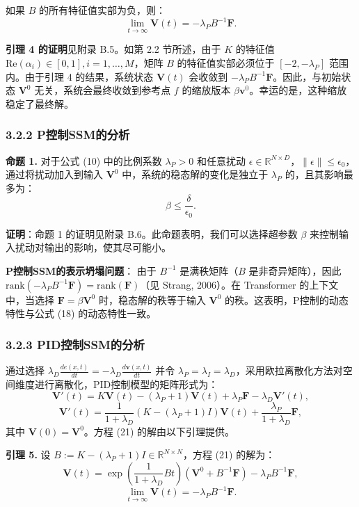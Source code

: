 \documentclass[lang=cn,a4paper,newtx]{elegantpaper}
\begin{document}
如果 $B$ 的所有特征值实部为负，则：
\[
\lim_{t \to \infty} \mathbf{V}(t) = -\lambda_P B^{-1}\mathbf{F}.
\]

\textbf{引理 4 的证明}见附录 B.5。如第 2.2 节所述，由于 $K$ 的特征值 $\text{Re}(\alpha_i) \in [0, 1], i = 1, \dots, M$，矩阵 $B$ 的特征值实部必须位于 $[-2, -\lambda_P]$ 范围内。由于引理 4 的结果，系统状态 $\mathbf{V}(t)$ 会收敛到 $-\lambda_P B^{-1}\mathbf{F}$。因此，与初始状态 $\mathbf{V}^0$ 无关，系统会最终收敛到参考点 $f$ 的缩放版本 $\beta \mathbf{v}^0$。幸运的是，这种缩放稳定了最终解。

\subsubsection*{3.2.2 P控制SSM的分析}

\textbf{命题 1.}  
对于公式 (10) 中的比例系数 $\lambda_P > 0$ 和任意扰动 $\epsilon \in \mathbb{R}^{N \times D}$，$\|\epsilon\| \leq \epsilon_0$，通过将扰动加入到输入 $\mathbf{V}^0$ 中，系统的稳态解的变化是独立于 $\lambda_P$ 的，且其影响最多为：
\[
\beta \leq \frac{\delta}{\epsilon_0}. \tag{20}
\]

\textbf{证明}：命题 1 的证明见附录 B.6。此命题表明，我们可以选择超参数 $\beta$ 来控制输入扰动对输出的影响，使其尽可能小。

\textbf{P控制SSM的表示坍塌问题}：  
由于 $B^{-1}$ 是满秩矩阵（$B$ 是非奇异矩阵），因此 $\text{rank}(-\lambda_P B^{-1}\mathbf{F}) = \text{rank}(\mathbf{F})$（见 Strang, 2006）。在 Transformer 的上下文中，当选择 $\mathbf{F} = \beta\mathbf{V}^0$ 时，稳态解的秩等于输入 $\mathbf{V}^0$ 的秩。这表明，P控制的动态特性与公式 (18) 的动态特性一致。

\subsubsection*{3.2.3 PID控制SSM的分析}

通过选择 $\lambda_D \frac{d e(x, t)}{d t} = -\lambda_D \frac{d\mathbf{v}(x, t)}{d t}$ 并令 $\lambda_P = \lambda_I = \lambda_D$，采用欧拉离散化方法对空间维度进行离散化，PID控制模型的矩阵形式为：
\[
\mathbf{V}'(t) = K\mathbf{V}(t) - (\lambda_P + 1)\mathbf{V}(t) + \lambda_P \mathbf{F} - \lambda_D \mathbf{V}'(t),
\]
\[
\mathbf{V}'(t) = \frac{1}{1 + \lambda_D} \left(K - (\lambda_P + 1)I\right)\mathbf{V}(t) + \frac{\lambda_P}{1 + \lambda_D}\mathbf{F}, \tag{21}
\]
其中 $\mathbf{V}(0) = \mathbf{V}^0$。方程 (21) 的解由以下引理提供。

\textbf{引理 5.}  
设 $B := K - (\lambda_P + 1)I \in \mathbb{R}^{N \times N}$，方程 (21) 的解为：
\[
\mathbf{V}(t) = \exp\left(\frac{1}{1 + \lambda_D}Bt\right)\left(\mathbf{V}^0 + B^{-1}\mathbf{F}\right) - \lambda_P B^{-1}\mathbf{F},
\]
\[
\lim_{t \to \infty} \mathbf{V}(t) = -\lambda_P B^{-1}\mathbf{F}.
\]
\end{document}
